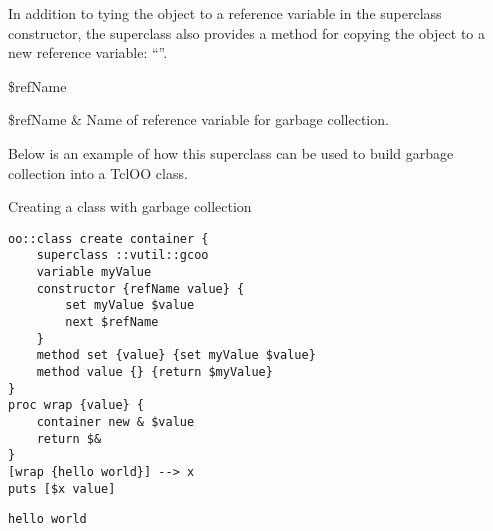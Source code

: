 \documentclass{article}
\begin{document}
In addition to tying the object to a reference variable in the superclass constructor, the  superclass also provides a method for copying the object to a new reference variable: ``\texttt{}''.
\begin{syntax}
 \$refName
\end{syntax}
\begin{args}
\$refName & Name of reference variable for garbage collection.
\end{args}

Below is an example of how this superclass can be used to build garbage collection into a TclOO class. 
\begin{example}{Creating a class with garbage collection}
\begin{lstlisting}
oo::class create container {
    superclass ::vutil::gcoo
    variable myValue
    constructor {refName value} {
        set myValue $value
        next $refName
    }
    method set {value} {set myValue $value}
    method value {} {return $myValue}
}
proc wrap {value} {
    container new & $value
    return $&
}
[wrap {hello world}] --> x
puts [$x value]
\end{lstlisting}
\tcblower
\begin{lstlisting}
hello world
\end{lstlisting}
\end{example}

\clearpage
\end{document}
